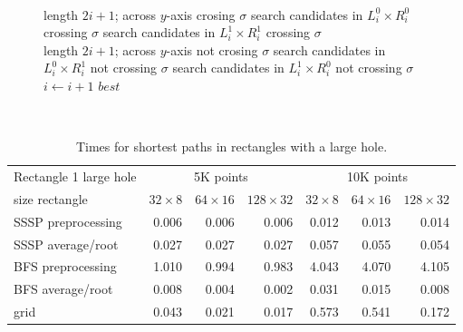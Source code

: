 \documentclass[a4paper,USenglish]{lipics}
\def\best{\mathit{best}}
\begin{document}
\begin{appendix}
\begin{figure}[htb]
\begin{center}
{{\begin{varwidth}{\linewidth}
\begin{codebox}
			\\ \>\> \Comment length $2i+1$; across $y$-axis crosing $\sigma$
			\li search candidates in $L^0_i\times R^0_{i}$ crossing $\sigma$
			\li search candidates in $L^1_i\times R^1_{i}$ crossing $\sigma$
			\\ \>\> \Comment length $2i+1$; across $y$-axis not crosing $\sigma$			
			\li search candidates in $L^0_i\times R^1_{i}$ not crossing $\sigma$
			\li search candidates in $L^1_i\times R^0_{i}$ not crossing $\sigma$
			\li $i \gets i+1$
			\End
		\End
    \li \Return $\best$
    \\[-2mm]
\end{codebox}
\end{varwidth}~~~~}}
\end{center}
\end{figure}


\begin{table}[h]
\begin{tabular}{l*{3}{r}|*{3}{r}}
Rectangle 1 large hole & \multicolumn{3}{c|}{5K points} & \multicolumn{3}{c}{10K points}\\
size rectangle	&	$32\times 8$	&	$64\times 16$	&	$128\times 32$	&	$32\times 8$	&	$64\times 16$	&	$128\times 32$\\						
\hline
SSSP preprocessing	&	0.006	&	0.006	&	0.006	&	0.012	&	0.013	&	0.014	\\
SSSP average/root	&	0.027	&	0.027	&	0.027	&	0.057	&	0.055	&	0.054	\\
BFS preprocessing	&	1.010	&	0.994	&	0.983	&	4.043	&	4.070	&	4.105	\\
BFS average/root	&	0.008	&	0.004	&	0.002	&	0.031	&	0.015	&	0.008	\\
grid				&	0.043	&	0.021	&	0.017	&	0.573	&	0.541	&	0.172
\end{tabular}
\caption{Times for shortest paths in rectangles with a large hole.}
\label{table3}
\end{table}



\end{appendix}
\end{document}
